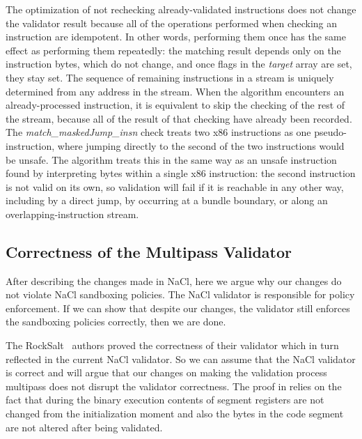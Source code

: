 \documentclass[conference]{IEEEtran}
\begin{document}
The optimization of not rechecking already-validated instructions does
not change the validator result because all of the operations
performed when checking an instruction are idempotent.
%
In other words, performing them once has the same effect as performing
them repeatedly: the matching result depends only on the instruction
bytes, which do not change, and once flags in the {\em target} array
are set, they stay set.
%
The sequence of remaining instructions in a stream is uniquely
determined from any address in the stream.
%
When the algorithm encounters an already-processed instruction, it is
equivalent to skip the checking of the rest of the stream, because all
of the result of that checking have already been recorded.
%
The \textit{match\_maskedJump\_insn} check treats two x86 instructions
as one pseudo-instruction, where jumping directly to the second of the
two instructions would be unsafe.
%
The algorithm treats this in the same way as an unsafe instruction
found by interpreting bytes within a single x86 instruction: the
second instruction is not valid on its own, so validation will fail if
it is reachable in any other way, including by a direct jump, by
occurring at a bundle boundary, or along an overlapping-instruction
stream.




\subsection{Correctness of the Multipass Validator}
After describing the changes made in NaCl, here we argue why our changes do not violate NaCl sandboxing  policies. The NaCl validator is responsible for  policy enforcement. If we can show that despite our changes, the validator still enforces the sandboxing policies correctly, then we are done. 


The RockSalt~\cite{morrisettRocksalt} authors proved the correctness of their validator which in turn reflected in the current NaCl validator. So we can assume that the NaCl validator is correct and will argue that our changes on making the validation process multipass does not disrupt the validator correctness. The proof in \cite{morrisettRocksalt} relies on the fact that during the binary execution contents of segment registers are not changed from the initialization moment and also the bytes  in the code segment are not altered after being validated. 
\end{document}
